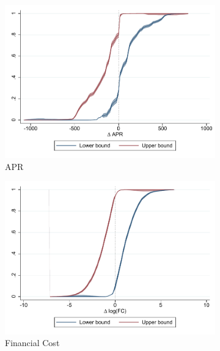 \documentclass[oneside,11pt]{article}
\begin{document}
\begin{figure}[H]
    \caption{Fan \& Park bounds}
    \label{fan_park_bounds}
    \begin{center}

    \begin{subfigure}{0.475\textwidth}
        \caption{APR}
        \centering
        \includegraphics[width=\textwidth]{Figuras/fan_park_bounds_apr.pdf}
    \end{subfigure}
    \begin{subfigure}{0.475\textwidth}
        \caption{Financial Cost}
        \centering
        \includegraphics[width=\textwidth]{Figuras/fan_park_bounds_fc_admin.pdf}
    \end{subfigure}
    \begin{subfigure}{0.475\textwidth}

\end{subfigure}
\end{center}
\end{figure}
\end{document}

